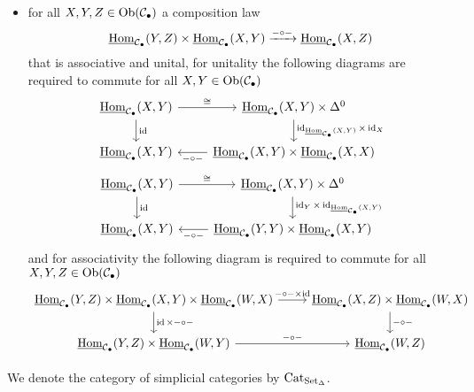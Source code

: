 \begin{defi}
\begin{itemize}
		\item 
		for all $ X , Y , Z \in \operatorname{Ob} ( \mathcal{ C }_\bullet ) $ a composition law
		\[
			\underline{ \operatorname{Hom} }_{ \mathcal{ C }_\bullet } ( Y , Z ) 
			\times 
			\underline{ \operatorname{Hom} }_{ \mathcal{ C }_\bullet } ( X , Y )
			\xrightarrow{- \circ - }
		   	\underline{ \operatorname{Hom} }_{ \mathcal{ C }_\bullet } ( X , Z )
		\] 
		that is associative and unital, for unitality the following diagrams are required to commute for all $ X , Y \in \operatorname{Ob} ( \mathcal{ C_\bullet } ) $
		\[
		\begin{tikzcd}
			 \underline{ \Hom }_{ \mathcal{ C }_\bullet } ( X , Y )
			 \ar[r, " \cong "]
			 \ar[d, "\id"]
			 &
			 \underline{ \Hom }_{ \mathcal{ C }_\bullet } ( X , Y ) \times \Delta^0
			 \ar[d, " \id_{  \underline{ \Hom }_{ \mathcal{ C }_\bullet } ( X ,Y ) } \times \id_X "]
			 \\
			 \underline{ \Hom }_{ \mathcal{ C }_\bullet } ( X , Y )
			 &
			 \underline{ \Hom }_{ \mathcal{ C }_\bullet } ( X , Y ) \times  \underline{ \Hom }_{ \mathcal{ C }_\bullet } ( X , X )
			 \ar[l, "- \circ -"] 
		\end{tikzcd}
		\]
		\[
		\begin{tikzcd}
			\underline{ \Hom }_{ \mathcal{ C }_\bullet } ( X , Y )
			\ar[r, " \cong "]
			\ar[d, "\id"]
			&
			\underline{ \Hom }_{ \mathcal{ C }_\bullet } ( X , Y ) \times \Delta^0
			\ar[d, " \id_Y \times \id_{  \underline{ \Hom }_{ \mathcal{ C }_\bullet } ( X ,Y ) } "]
			\\
			\underline{ \Hom }_{ \mathcal{ C }_\bullet } ( X , Y )
			&
			\underline{ \Hom }_{ \mathcal{ C }_\bullet } ( Y , Y ) \times \underline{ \Hom }_{ \mathcal{ C }_\bullet } ( X , Y )
			\ar[l, "- \circ -"] 
		\end{tikzcd}
		\]
		and for associativity the following diagram is required to commute for all $ X , Y , Z \in \operatorname{Ob} ( \mathcal{ C }_\bullet ) $
		\[
		\begin{tikzcd}
			\underline{ \Hom }_{ \mathcal{ C }_\bullet }  ( Y , Z ) 
			\times
			\underline{ \Hom }_{ \mathcal{ C }_\bullet }  ( X , Y ) 
			\times 
			\underline{ \Hom }_{ \mathcal{ C }_\bullet } ( W , X )
			\ar[r, " - \circ - \times \id"]
			\ar[d, " \id \times - \circ -"]
			&
			\underline{ \Hom }_{ \mathcal{ C }_\bullet } ( X , Z )
			\times
			\underline{ \Hom }_{ \mathcal{ C }_\bullet } ( W ,X ) 
			\ar[d, "- \circ - "]
			\\
			\underline{ \Hom }_{ \mathcal{ C }_\bullet } ( Y , Z )
			\times 
			\underline{ \Hom }_{ \mathcal{ C }_\bullet } ( W ,Y ) 
			\ar[r, " - \circ - "]
			&
			\underline{ \Hom }_{ \mathcal{ C }_\bullet } ( W , Z ) 
		\end{tikzcd}
		\]
	\end{itemize}
	We denote the category of simplicial categories by $ \operatorname{Cat}_{ \operatorname{Set}_{\Delta} } $.
\end{defi}

